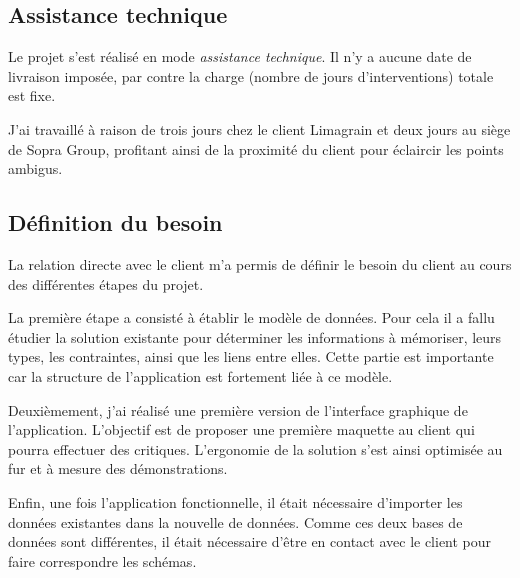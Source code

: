 \subsection{Assistance technique}


Le projet s'est réalisé en mode \textit{assistance technique}.
Il n'y a aucune date de livraison imposée, par contre la charge (nombre de jours d'interventions) totale est fixe.

J'ai travaillé à raison de trois jours chez le client Limagrain et deux jours au siège de Sopra Group, profitant ainsi de la proximité du client pour éclaircir les points ambigus.


\subsection{Définition du besoin}

La relation directe avec le client m'a permis de définir le besoin du client au cours des différentes étapes du projet.

La première étape a consisté à établir le modèle de données.
Pour cela il a fallu étudier la solution existante pour déterminer les informations à mémoriser, leurs types, les contraintes, ainsi que les liens entre elles.
Cette partie est importante car la structure de l'application est fortement liée à ce modèle.

Deuxièmement, j'ai réalisé une première version de l'interface graphique de l'application.
L'objectif est de proposer une première maquette au client qui pourra effectuer des critiques.
L'ergonomie de la solution s'est ainsi optimisée au fur et à mesure des démonstrations.

Enfin, une fois l'application fonctionnelle, il était nécessaire d'importer les données existantes dans la nouvelle de données.
Comme ces deux bases de données sont différentes, il était nécessaire d'être en contact avec le client pour faire correspondre les schémas.


